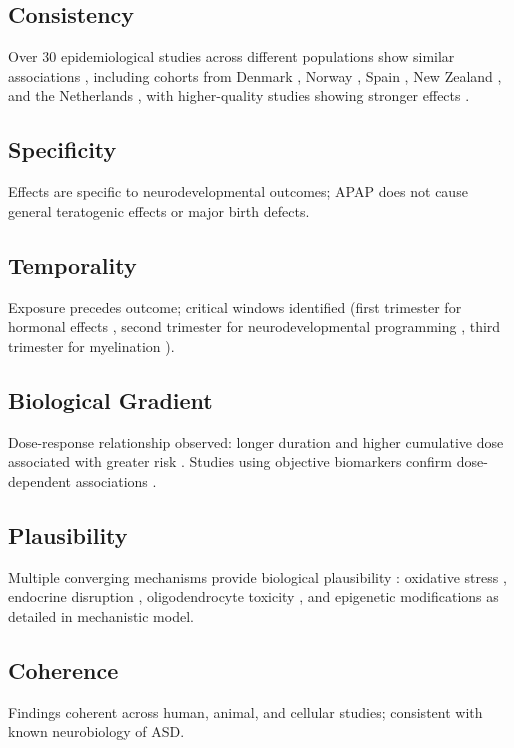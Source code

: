\documentclass[12pt]{article}
\begin{document}
\subsection{Consistency}
Over 30 epidemiological studies across different populations show similar associations \citep{navarro2025}, including cohorts from Denmark \citep{liew2016}, Norway \citep{ystrom2017}, Spain \citep{avella2016}, New Zealand \citep{thompson2014}, and the Netherlands \citep{vlenterie2016}, with higher-quality studies showing stronger effects \citep{chen2023}.



\subsection{Specificity}
Effects are specific to neurodevelopmental outcomes; APAP does not cause general teratogenic effects or major birth defects.





\subsection{Temporality}
Exposure precedes outcome; critical windows identified (first trimester for hormonal effects \citep{kristensen2016}, second trimester for neurodevelopmental programming \citep{avella2016}, third trimester for myelination \citep{liew2021}).

\subsection{Biological Gradient}
Dose-response relationship observed: longer duration and higher cumulative dose associated with greater risk \citep{liew2014,brandlistuen2013}. Studies using objective biomarkers confirm dose-dependent associations \citep{ji2020}.

\subsection{Plausibility}
Multiple converging mechanisms provide biological plausibility \citep{bauer2021}: oxidative stress \citep{parker2020}, endocrine disruption \citep{kristensen2016}, oligodendrocyte toxicity \citep{perez2012}, and epigenetic modifications \citep{zhu2021} as detailed in mechanistic model.

\subsection{Coherence}
Findings coherent across human, animal, and cellular studies; consistent with known neurobiology of ASD.
\end{document}
